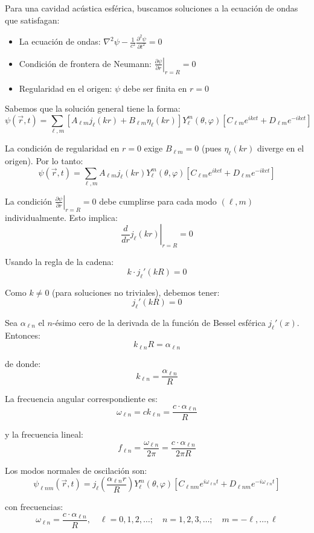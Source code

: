 \documentclass[a4paper]{article}
\begin{document}
Para una cavidad acústica esférica, buscamos soluciones a la ecuación de ondas que satisfagan:
\begin{itemize}
\item La ecuación de ondas: $\nabla^2\psi - \frac{1}{c^2}\frac{\partial^2\psi}{\partial t^2} = 0$
\item Condición de frontera de Neumann: $\left.\frac{\partial\psi}{\partial r}\right|_{r=R} = 0$
\item Regularidad en el origen: $\psi$ debe ser finita en $r=0$
\end{itemize}


Sabemos que la solución general tiene la forma:
$$\psi(\vec{r}, t) = \sum_{\ell,m} [A_{\ell m} j_\ell(kr) + B_{\ell m} \eta_\ell(kr)] Y_\ell^m(\theta, \varphi) [C_{\ell m} e^{ikct} + D_{\ell m} e^{-ikct}]$$

La condición de regularidad en $r=0$ exige $B_{\ell m} = 0$ (pues $\eta_\ell(kr)$ diverge en el origen). Por lo tanto:
$$\psi(\vec{r}, t) = \sum_{\ell,m} A_{\ell m} j_\ell(kr) Y_\ell^m(\theta, \varphi) [C_{\ell m} e^{ikct} + D_{\ell m} e^{-ikct}]$$


La condición $\left.\frac{\partial\psi}{\partial r}\right|_{r=R} = 0$ debe cumplirse para cada modo $(\ell,m)$ individualmente. Esto implica:
$$\left.\frac{d}{dr}j_\ell(kr)\right|_{r=R} = 0$$

Usando la regla de la cadena:
$$k \cdot j_\ell'(kR) = 0$$

Como $k \neq 0$ (para soluciones no triviales), debemos tener:
$$j_\ell'(kR) = 0$$


Sea $\alpha_{\ell n}$ el $n$-ésimo cero de la derivada de la función de Bessel esférica $j_\ell'(x)$. Entonces:
$$k_{\ell n} R = \alpha_{\ell n}$$

de donde:
$$k_{\ell n} = \frac{\alpha_{\ell n}}{R}$$

La frecuencia angular correspondiente es:
$$\omega_{\ell n} = c k_{\ell n} = \frac{c \cdot \alpha_{\ell n}}{R}$$

y la frecuencia lineal:
$$f_{\ell n} = \frac{\omega_{\ell n}}{2\pi} = \frac{c \cdot \alpha_{\ell n}}{2\pi R}$$

Los modos normales de oscilación son:
$$\psi_{\ell n m}(\vec{r}, t) = j_\ell\left(\frac{\alpha_{\ell n} r}{R}\right) Y_\ell^m(\theta, \varphi) [C_{\ell n m} e^{i\omega_{\ell n}t} + D_{\ell n m} e^{-i\omega_{\ell n}t}]$$

con frecuencias:
$$\omega_{\ell n} = \frac{c \cdot \alpha_{\ell n}}{R}, \quad \ell = 0, 1, 2, \ldots; \quad n = 1, 2, 3, \ldots; \quad m = -\ell, \ldots, \ell$$
\end{document}
